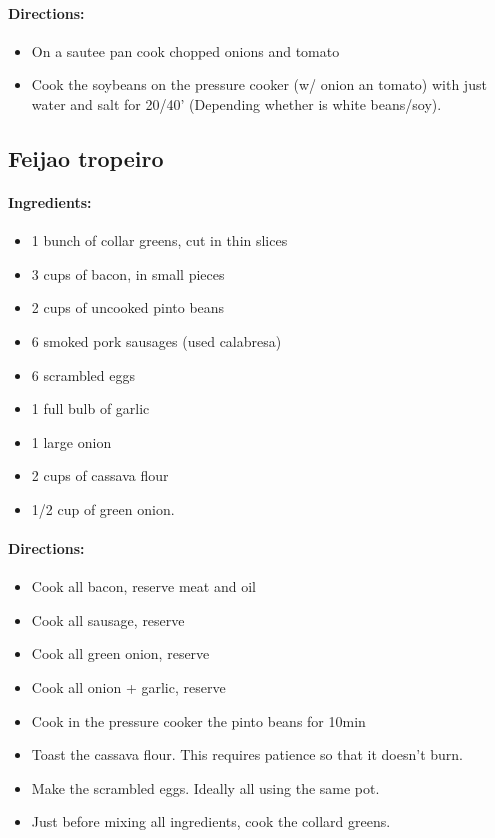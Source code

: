 \documentclass{article}
\begin{document}
\paragraph{Directions:}
\begin{itemize}
    \item On a sautee pan cook chopped onions and tomato
    \item Cook the soybeans on the pressure cooker (w/ onion an tomato) with just water and salt for 20/40' (Depending whether is white beans/soy).
\end{itemize}

\subsection{Feijao tropeiro}

\paragraph{Ingredients:}
\begin{itemize}
    \item 1 bunch of collar greens, cut in thin slices
    \item 3 cups of bacon, in small pieces
    \item 2 cups of uncooked pinto beans
    \item 6 smoked pork sausages (used calabresa)
    \item 6 scrambled eggs
    \item 1 full bulb of garlic
    \item 1 large onion
    \item 2 cups of cassava flour
    \item 1/2 cup of green onion.
\end{itemize}

\paragraph{Directions:}
\begin{itemize}
    \item Cook all bacon, reserve meat and oil
    \item Cook all sausage, reserve
    \item Cook all green onion, reserve
    \item Cook all onion + garlic, reserve
    \item Cook in the pressure cooker the pinto beans for 10min
    \item Toast the cassava flour. This requires patience so that it doesn't burn.
    \item Make the scrambled eggs. Ideally all using the same pot.
    \item Just before mixing all ingredients, cook the collard greens.
\end{itemize}
\end{document}
